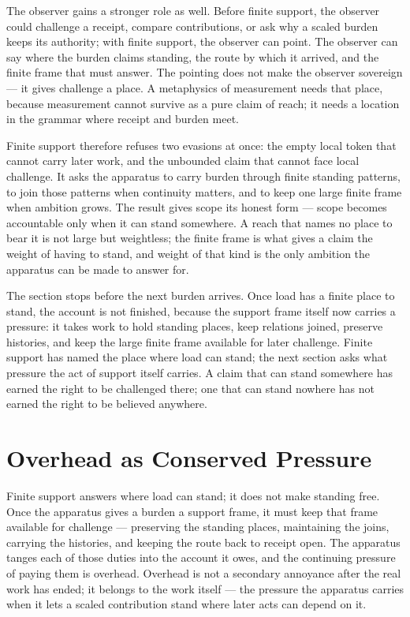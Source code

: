 The observer gains a stronger role as well. Before finite support, the observer could challenge a receipt, compare contributions, or ask why a scaled burden keeps its authority; with finite support, the observer can point. The observer can say where the burden claims standing, the route by which it arrived, and the finite frame that must answer. The pointing does not make the observer sovereign --- it gives challenge a place. A metaphysics of measurement needs that place, because measurement cannot survive as a pure claim of reach; it needs a location in the grammar where receipt and burden meet.

Finite support therefore refuses two evasions at once: the empty local token that cannot carry later work, and the unbounded claim that cannot face local challenge. It asks the apparatus to carry burden through finite standing patterns, to join those patterns when continuity matters, and to keep one large finite frame when ambition grows. The result gives scope its honest form --- scope becomes accountable only when it can stand somewhere. A reach that names no place to bear it is not large but weightless; the finite frame is what gives a claim the weight of having to stand, and weight of that kind is the only ambition the apparatus can be made to answer for.

The section stops before the next burden arrives. Once load has a finite place to stand, the account is not finished, because the support frame itself now carries a pressure: it takes work to hold standing places, keep relations joined, preserve histories, and keep the large finite frame available for later challenge. Finite support has named the place where load can stand; the next section asks what pressure the act of support itself carries. A claim that can stand somewhere has earned the right to be challenged there; one that can stand nowhere has not earned the right to be believed anywhere.

\section{Overhead as Conserved Pressure}

Finite support answers where load can stand; it does not make standing free. Once the apparatus gives a burden a support frame, it must keep that frame available for challenge --- preserving the standing places, maintaining the joins, carrying the histories, and keeping the route back to receipt open. The apparatus tanges each of those duties into the account it owes, and the continuing pressure of paying them is overhead. Overhead is not a secondary annoyance after the real work has ended; it belongs to the work itself --- the pressure the apparatus carries when it lets a scaled contribution stand where later acts can depend on it.

